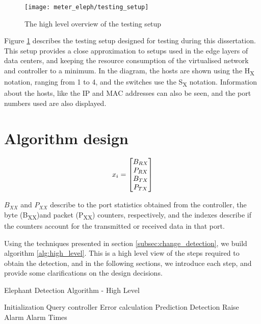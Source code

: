 \pagebreak
\begin{figure} 
    \centering
    \texttt{[image: meter\_eleph/testing\_setup]}
    \caption {The high level overview of the testing setup}
    \label{fig:test_setup}
\end{figure} 

\par Figure \ref{fig:test_setup} describes the testing setup designed for testing during this dissertation. This setup provides a close approximation to setups used in the edge layers of data centers, and keeping the
resource consumption of the virtualised network and controller to a minimum. In the diagram, the hosts are shown using the H\textsubscript{X} notation, ranging from 1 to 4, and the switches use the S\textsubscript{X} 
notation. Information about the hosts, like the IP and MAC addresses can also be seen, and the port numbers used are also displayed.

\section {Algorithm design}

\begin {equation*}
\centering
x_i = 
\begin{bmatrix}
B_{RX}\\
P_{RX}\\
B_{TX}\\
P_{TX}\\
\end{bmatrix}
\end {equation*}

\par $B_{XX}$ and $P_{XX}$ describe to the port statistics obtained from the controller, the byte (B\textsubscript{XX})and packet (P\textsubscript{XX}) counters, respectively, and the indexes describe if the counters
account for the transmitted or received data in that port.

\par Using the techniques presented in section \ref{subsec:change_detection}, we build algorithm \ref{alg:high_level}. This is a high level view of the steps required to obtain the detection, and in the following sections,
we introduce each step, and provide some clarifications on the design decisions.

\pagebreak

\begin{algorithm}[H]
    \caption{Elephant Detection Algorithm - High Level} \label{alg:high_level}
    \begin{algorithmic}[1]
            \State Initialization
            \State Query controller
            \Loop
                \State Error calculation
                \State Prediction
                \State Detection
                    \State Raise Alarm
                \EndIf
            \EndLoop
        \EndProcedure 
        \State \Return Alarm Times
    \end{algorithmic}
\end{algorithm}

